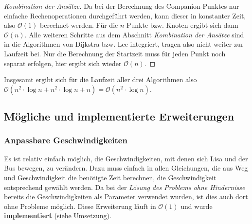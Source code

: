 \documentclass[a4paper, notitlepage, 12pt]{scrartcl}
\begin{document}
\begin{proof}[Kombination der Ansätze]
	Da bei der Berechnung des Companion-Punktes nur einfache Rechenoperationen durchgeführt werden, kann dieser in konstanter Zeit, also $\mathcal{O}(1)$ berechnet werden. Für die $n$ Punkte bzw. Knoten ergibt sich dann $\mathcal{O}(n)$. Alle weiteren Schritte aus dem Abschnitt \emph{Kombination der Ansätze} sind in die Algorithmen von Dijkstra bzw. Lee integriert, tragen also nicht weiter zur Laufzeit bei. Nur die Berechnung der Startzeit muss für jeden Punkt noch separat erfolgen, hier ergibt sich wieder $\mathcal{O}(n)$.
\end{proof}
Insgesamt ergibt sich für die Laufzeit aller drei Algorithmen also $\mathcal{O}(n^2 \cdot \log n + n^2 \cdot \log n + n) = \mathcal{O}(n^2 \cdot \log n)$.
 \subsection{Mögliche und implementierte Erweiterungen}
 \subsubsection{Anpassbare Geschwindigkeiten}
 Es ist relativ einfach möglich, die Geschwindigkeiten, mit denen sich Lisa und der Bus bewegen, zu verändern. Dazu muss einfach in allen Gleichungen, die aus Weg und Geschwindigkeit die benötigte Zeit berechnen, die Geschwindigkeit entsprechend gewählt werden. Da bei der \emph{Lösung des Problems ohne Hindernisse} bereits die Geschwindigkeiten als Parameter verwendet wurden, ist dies auch dort ohne Probleme möglich. Diese Erweiterung läuft in $\mathcal{O}(1)$ und wurde \textbf{implementiert} (siehe Umsetzung).
\end{document}
